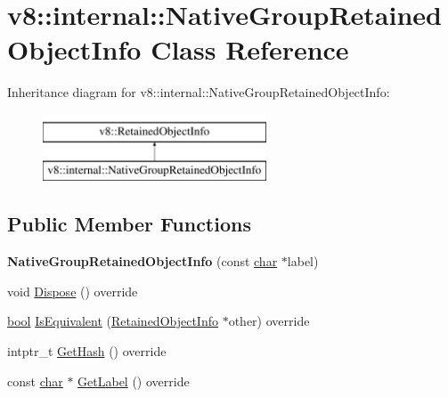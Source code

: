 \hypertarget{classv8_1_1internal_1_1NativeGroupRetainedObjectInfo}{}\section{v8\+:\+:internal\+:\+:Native\+Group\+Retained\+Object\+Info Class Reference}
\label{classv8_1_1internal_1_1NativeGroupRetainedObjectInfo}
Inheritance diagram for v8\+:\+:internal\+:\+:Native\+Group\+Retained\+Object\+Info\+:\begin{figure}[H]
\begin{center}
\leavevmode
\includegraphics[height=2.000000cm]{classv8_1_1internal_1_1NativeGroupRetainedObjectInfo}
\end{center}
\end{figure}
\subsection*{Public Member Functions}
\begin{DoxyCompactItemize}
\item 
\mbox{\label{classv8_1_1internal_1_1NativeGroupRetainedObjectInfo_ac0426b5022da76fc2a5229ae7967c99a}} 
{\bfseries Native\+Group\+Retained\+Object\+Info} (const \mbox{\hyperlink{classchar}{char}} $\ast$label)
\item 
void \mbox{\hyperlink{classv8_1_1internal_1_1NativeGroupRetainedObjectInfo_a27dc763171801350dc7f7b2b9e74ee42}{Dispose}} () override
\item 
\mbox{\hyperlink{classbool}{bool}} \mbox{\hyperlink{classv8_1_1internal_1_1NativeGroupRetainedObjectInfo_a8d54367b99192c9081d03ccdc8e97612}{Is\+Equivalent}} (\mbox{\hyperlink{classv8_1_1RetainedObjectInfo}{Retained\+Object\+Info}} $\ast$other) override
\item 
intptr\+\_\+t \mbox{\hyperlink{classv8_1_1internal_1_1NativeGroupRetainedObjectInfo_a0bb1682d322ad1c63b22058cf5a75a6f}{Get\+Hash}} () override
\item 
const \mbox{\hyperlink{classchar}{char}} $\ast$ \mbox{\hyperlink{classv8_1_1internal_1_1NativeGroupRetainedObjectInfo_a8b9d63379a9e6647ecbe169d6f9223ee}{Get\+Label}} () override
\end{DoxyCompactItemize}


